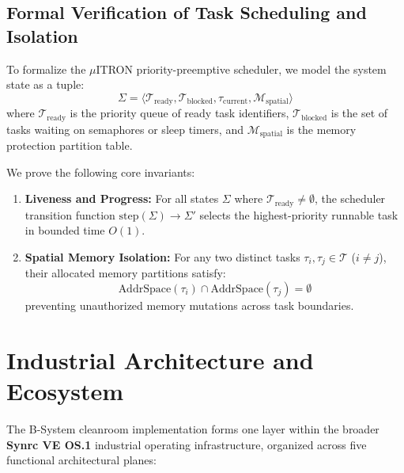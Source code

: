 \documentclass[10pt,journal,compsoc,twocolumn]{article}
\begin{document}
\subsection{Formal Verification of Task Scheduling and Isolation}
To formalize the $\mu$ITRON priority-preemptive scheduler, we model the system state as a tuple:
\begin{equation}
\Sigma = \langle \mathcal{T}_{\text{ready}}, \mathcal{T}_{\text{blocked}}, \tau_{\text{current}}, \mathcal{M}_{\text{spatial}} \rangle
\end{equation}
where $\mathcal{T}_{\text{ready}}$ is the priority queue of ready task identifiers, $\mathcal{T}_{\text{blocked}}$ is the set of tasks waiting on semaphores or sleep timers, and $\mathcal{M}_{\text{spatial}}$ is the memory protection partition table.

We prove the following core invariants:
\begin{enumerate}[leftmargin=*]
    \item \textbf{Liveness and Progress:} For all states $\Sigma$ where $\mathcal{T}_{\text{ready}} \neq \emptyset$, the scheduler transition function $\text{step}(\Sigma) \to \Sigma'$ selects the highest-priority runnable task in bounded time $O(1)$.
    \item \textbf{Spatial Memory Isolation:} For any two distinct tasks $\tau_i, \tau_j \in \mathcal{T}$ ($i \neq j$), their allocated memory partitions satisfy:
    \begin{equation}
    \text{AddrSpace}(\tau_i) \cap \text{AddrSpace}(\tau_j) = \emptyset
    \end{equation}
    preventing unauthorized memory mutations across task boundaries.
\end{enumerate}

\section{Industrial Architecture and Ecosystem}
\label{sec:ecosystem}

The B-System cleanroom implementation forms one layer within the broader \textbf{Synrc VE OS.1} industrial operating infrastructure, organized across five functional architectural planes:
\end{document}
